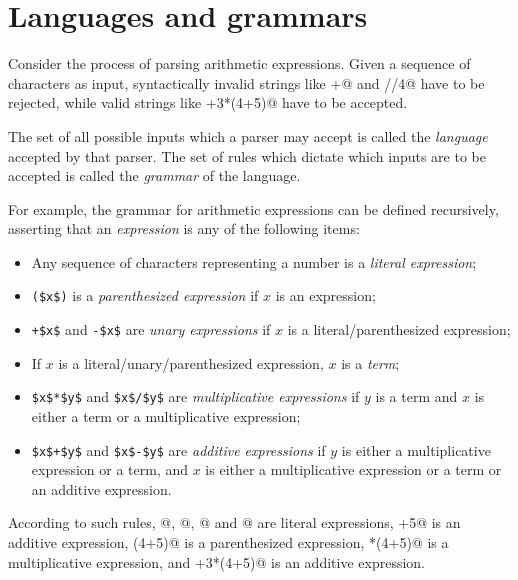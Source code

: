 \documentclass[UdineBachThesis,american,11pt]{PhdThesis}
\begin{document}
  \section{Languages and grammars}

  Consider the process of parsing arithmetic expressions. Given a sequence of
  characters as input, syntactically invalid strings like +@ and
  //4@ have to be rejected, while valid strings like
  +3*(4+5)@ have to be accepted.

  The set of all possible inputs which a parser may accept is called the
  \emph{language} accepted by that parser. The set of rules which dictate which
  inputs are to be accepted is called the \emph{grammar} of the language.

  For example, the grammar for arithmetic expressions can be defined
  recursively, asserting that an \emph{expression} is any of the following
  items:

  \begin{itemize}
    \item Any sequence of characters representing a number is a \emph{literal
    expression};

    \item \lstinline[mathescape]@($x$)@ is a \emph{parenthesized expression} if
    $x$ is an expression;

    \item \lstinline[mathescape]@+$x$@ and \lstinline[mathescape]@-$x$@ are
    \emph{unary expressions} if $x$ is a literal/parenthesized expression;

    \item If $x$ is a literal/unary/parenthesized expression, $x$ is a
    \emph{term};

    \item \lstinline[mathescape]@$x$*$y$@ and \lstinline[mathescape]@$x$/$y$@
    are \emph{multiplicative expressions} if $y$ is a term and $x$ is either a
    term or a multiplicative expression;

    \item \lstinline[mathescape]@$x$+$y$@ and \lstinline[mathescape]@$x$-$y$@
    are \emph{additive expressions} if $y$ is either a multiplicative expression
    or a term, and $x$ is either a multiplicative expression or a term or an
    additive expression.
  \end{itemize}

  According to such rules, @, @, @ and
  @ are literal expressions, +5@ is an additive
  expression, \lstinline@(4+5)@ is a parenthesized expression,
  *(4+5)@ is a multiplicative expression, and +3*(4+5)@
  is an additive expression.
\end{document}
